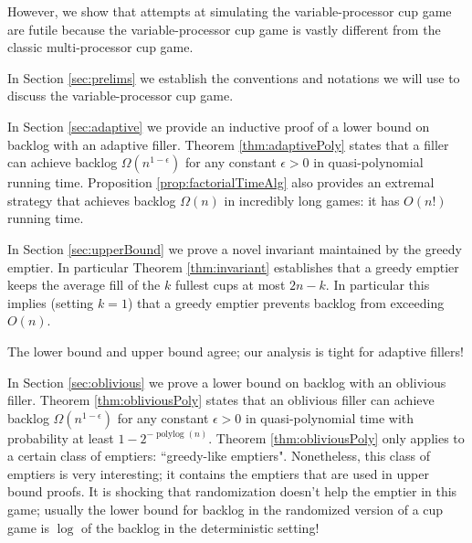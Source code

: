 \documentclass[twocolumn]{article}[10pt]
\renewcommand{\paragraph}[1]{\vspace{0.09in}\noindent{\bf \boldmath #1.}}
\DeclareMathOperator{\polylog}{\text{polylog}}
\begin{document}
However, we show that attempts at simulating the variable-processor cup
game are futile because the variable-processor cup game
is vastly different from the classic multi-processor cup game. 

\paragraph{Outline and Results}
In Section \ref{sec:prelims} we establish the conventions and notations we will
use to discuss the variable-processor cup game. 

In Section \ref{sec:adaptive} we provide an inductive
proof of a lower bound on backlog with an adaptive filler. Theorem 
\ref{thm:adaptivePoly} states that a filler can achieve backlog
$\Omega(n^{1-\epsilon})$ for any constant $\epsilon > 0$ in quasi-polynomial
running time. Proposition \ref{prop:factorialTimeAlg} also provides an extremal strategy
that achieves backlog $\Omega(n)$ in incredibly
long games: it has $O(n!)$ running time.

In Section \ref{sec:upperBound} we prove a novel invariant maintained
by the greedy emptier. In particular Theorem \ref{thm:invariant} establishes
that a greedy emptier keeps the average fill of the $k$ fullest cups at most
$2n-k$. In particular this implies (setting $k=1$) that a greedy emptier
prevents backlog from exceeding $O(n)$. 

The lower bound and upper bound agree; our analysis is tight for adaptive fillers!

In Section \ref{sec:oblivious} we prove a lower bound on backlog with an oblivious filler. 
Theorem \ref{thm:obliviousPoly} states that an oblivious filler can achieve
backlog $\Omega(n^{1-\epsilon})$ for any constant $\epsilon > 0$ in
quasi-polynomial time with probability at least $1-2^{-\polylog(n)}$.
Theorem \ref{thm:obliviousPoly} only applies to a certain class of emptiers:
``greedy-like emptiers". Nonetheless, this class of emptiers is very
interesting; it contains the emptiers that are used in upper bound proofs.
It is shocking that randomization doesn't help the emptier in this game;
usually the lower bound for backlog in the randomized version of a cup game is
$\log$ of the backlog in the deterministic setting!
\end{document}
